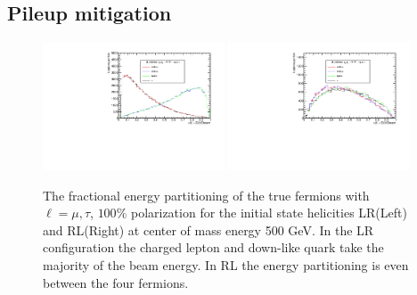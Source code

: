 \subsection{Pileup mitigation}
\label{subsec:Pileup_mitigation}
\begin{figure}

\includegraphics[width=0.48\textwidth]{hxLR.pdf}
\includegraphics[width=0.48\textwidth]{hxRL.pdf}
\caption{The fractional energy partitioning of the true fermions with $\ell = \mu,\tau$, $100\%$ polarization for the initial state helicities LR(Left) and RL(Right) at center of mass energy 500 GeV. In the LR configuration the charged lepton and down-like quark take the majority of the beam energy. In RL the energy partitioning is even between the four fermions. }
\label{fig:Epartition}
\end{figure}


